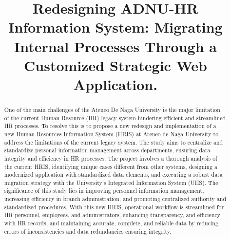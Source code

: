 \documentclass[oneside]{etd}
\title{Redesigning ADNU-HR Information System: Migrating Internal Processes Through a Customized Strategic Web Application.}
\begin{document}
\maketitle
\makerecomm
\makeacceptance
\makedeclaration


\begin{abstract}
    One of the main challenges of the Ateneo De Naga University is the major limitation of the current Human Resource (HR) legacy system hindering efficient and streamlined HR processes. To resolve this is to propose a new redesign and implementation of a new Human Resources Information System (HRIS) at Ateneo de Naga University to address the limitations of the current legacy system. The study aims to centralize and standardize personal information management across departments, ensuring data integrity and efficiency in HR processes. The project involves a thorough analysis of the current HRIS, identifying unique cases different from other systems, designing a modernized application with standardized data elements, and executing a robust data migration strategy with the University's Integrated Information System (UIIS). The significance of this study lies in improving personnel information management, increasing efficiency in branch administration, and promoting centralized authority and standardized procedures. With this new HRIS, operational workflow is streamlined for HR personnel, employees, and administrators, enhancing transparency, and efficiency with HR records, and maintaining accurate, complete, and reliable data by reducing errors of inconsistencies and data redundancies ensuring integrity.
\end{abstract}




\begingroup
\renewcommand*{\addvspace}[1]{}
\tableofcontents
\listoffigures
\listoftables
\endgroup

\beginbody
{}





% 
% 

\appendix
  
  

\nocite{*}

{
\singlespace

}


\end{document}

